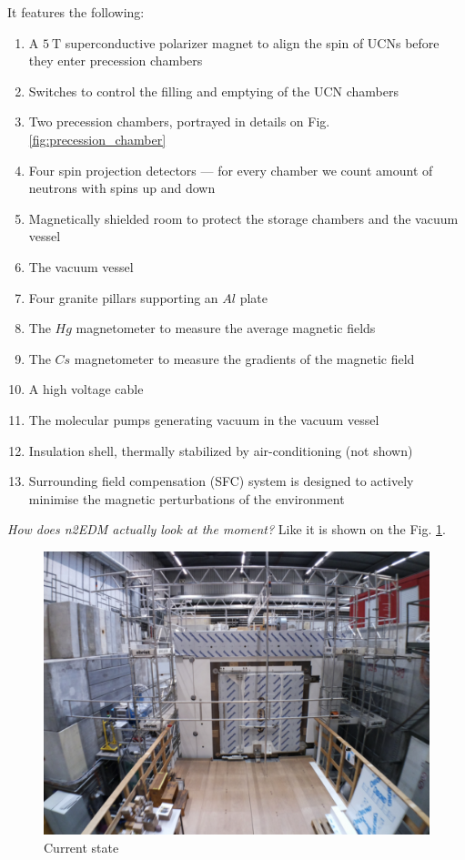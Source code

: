 It features \cite{Abel2018} the following:
\begin{enumerate}
	\item A $5\ \text{T}$ superconductive polarizer magnet to align the spin of UCNs before they enter precession chambers
	\item Switches to control the filling and emptying of the UCN chambers
	\item Two precession chambers, portrayed in details on Fig. \ref{fig:precession_chamber}
	\item Four spin projection detectors --- for every chamber we count amount of neutrons with spins up and down
	\item Magnetically shielded room to protect the storage chambers and the vacuum vessel
	\item The vacuum vessel
	\item Four granite pillars supporting an $Al$ plate
	\item The $Hg$ magnetometer to measure the average magnetic fields
	\item The $Cs$ magnetometer to measure the gradients of the magnetic field
	\item A high voltage cable
	\item The molecular pumps generating vacuum in the vacuum vessel
	\item Insulation shell, thermally stabilized by air-conditioning (not shown)
	\item Surrounding field compensation (SFC) system is designed to actively minimise the magnetic perturbations of the environment
\end{enumerate}

\textit{How does n2EDM actually look at the moment?} Like it is shown on the Fig. \ref{fig:n2edm_photo}.
\begin{figure}[h]
	\centering
	\includegraphics[width=.79\textwidth]{img/n2edm_photo}
	\caption{Current state}
	\label{fig:n2edm_photo}
\end{figure}











